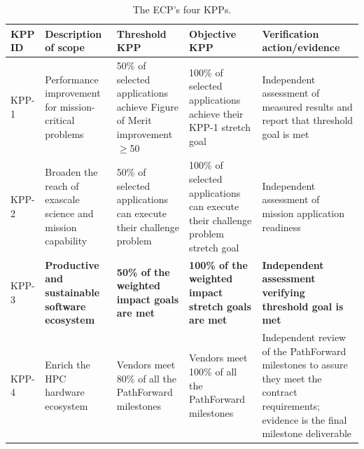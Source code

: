 \begin{table}[H]
\footnotesize
\centering
\begin{tabular}{|L{0.5in}|L{1.20in}|L{1.10in}|L{1.10in}|L{1.70in}|}
\hline
{}
\textbf{KPP ID} & \textbf{Description of scope} & \textbf{Threshold KPP} & \textbf{Objective KPP} & \textbf{Verification action/evidence}\\ 
\hline
KPP-1 & Performance improvement for
  mission-critical problems & 50\% of selected applications achieve
  Figure of Merit improvement $\geq$50 & 100\% of selected applications achieve
  their KPP-1 stretch goal & Independent assessment of measured
  results and report that threshold goal is met \\ 
\hline
KPP-2 & Broaden the reach of exascale science
  and mission capability & 50\% of selected applications can
  execute their challenge problem & 100\% of selected applications can
  execute their challenge problem stretch goal & Independent assessment of mission
  application readiness \\ 
\hline
KPP-3 & \textbf{Productive and sustainable software ecosystem} & \textbf{50\% of the weighted impact goals are met} & \textbf{100\% of the weighted impact stretch goals are met} & \textbf{Independent assessment verifying threshold goal is met} \\ 
\hline
KPP-4 & Enrich the HPC hardware ecosystem & Vendors meet 80\% of all the PathForward
  milestones & Vendors meet 100\% of all the PathForward
  milestones & Independent
  review of the PathForward
  milestones to assure they meet the contract requirements; evidence is the
  final milestone deliverable \\
\hline
\end{tabular}
	\caption{The ECP's four KPPs.}
	\label{table:kpp-definitions}
\end{table}

